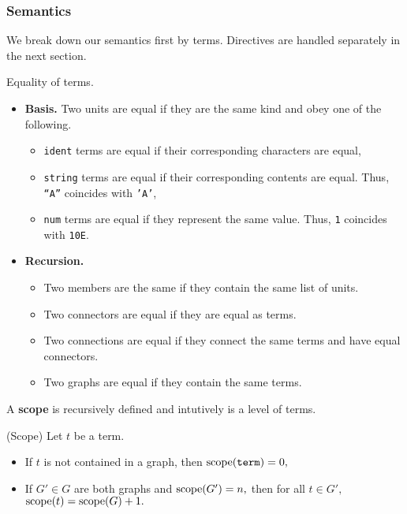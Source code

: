 \subsubsection*{Semantics}
We break down our semantics first by terms. Directives are handled separately in the next section.
\begin{definition}
Equality of terms.
\begin{itemize}
  \item \textbf{Basis.} Two units are equal if they are the same kind and obey one of the following.
	\begin{itemize}
	  \item \texttt{ident} terms are equal if their corresponding characters are equal,
      \item \texttt{string} terms are equal if their corresponding contents are equal. Thus, \texttt{``A''} coincides with \texttt{'A'},
	  \item \texttt{num} terms are equal if they represent the same value. Thus, \texttt{1} coincides with \texttt{10E}.
	\end{itemize}
  \item \textbf{Recursion.}
        \begin{itemize}
        \item Two members are the same if they contain the same list of units. %
        \item Two connectors are equal if they are equal as terms. %
 		  \item Two connections are equal if they connect the same terms and have equal connectors.
		  \item Two graphs are equal if they contain the same terms.
	\end{itemize}
\end{itemize}
\end{definition}
A \textbf{scope} is recursively defined and intutively is a level of terms.
\begin{definition} (Scope)
 Let $t$ be a term.
  \begin{itemize}
	\item If $t$ is not contained in a graph, then $\textrm{scope}(\texttt{term}) = 0,$
	\item If $G' \in G$ are both graphs and $\textrm{scope}(G') = n,$ then for all $t \in G',$ $\textrm{scope}(t) = \textrm{scope}(G) + 1.$
\end{itemize}
\end{definition}
